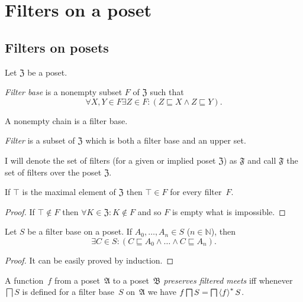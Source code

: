 \section{Filters on a poset}


\subsection{Filters on posets}

Let $\mathfrak{Z}$ be a poset.
\begin{defn}
\emph{Filter base} is a nonempty subset $F$ of
$\mathfrak{Z}$ such that
\[
\forall X,Y\in F\exists Z\in F:(Z\sqsubseteq X\land Z\sqsubseteq Y).
\]
\end{defn}
\begin{obvious}
A nonempty chain is a filter base.\end{obvious}
\begin{defn}
\emph{Filter} is a subset of $\mathfrak{Z}$
which is both a filter base and an upper set.
\end{defn}
I will denote the set of filters (for a given or implied poset $\mathfrak{Z}$)
as $\mathfrak{F}$ and call $\mathfrak{F}$ the set of filters over
the poset $\mathfrak{Z}$.
\begin{prop}
If $\top$ is the maximal element of $\mathfrak{Z}$ then $\top\in F$
for every filter~$F$.\end{prop}
\begin{proof}
If $\top\notin F$ then $\forall K\in\mathfrak{Z}:K\notin F$ and
so $F$ is empty what is impossible.\end{proof}
\begin{prop}
Let $S$ be a filter base on a poset. If $A_{0},\ldots,A_{n}\in S$
($n\in\mathbb{N}$), then 
\[
\exists C\in S:(C\sqsubseteq A_{0}\land\ldots\land C\sqsubseteq A_{n}).
\]
\end{prop}
\begin{proof}
It can be easily proved by induction.\end{proof}
\begin{defn}
A function~$f$ from a poset~$\mathfrak{A}$ to a poset~$\mathfrak{B}$
\emph{preserves filtered meets} iff whenever $\bigsqcap S$ is defined
for a filter base~$S$ on~$\mathfrak{A}$ we have $f\bigsqcap S=\bigsqcap\left\langle f\right\rangle ^{\ast}S$.
\end{defn}

